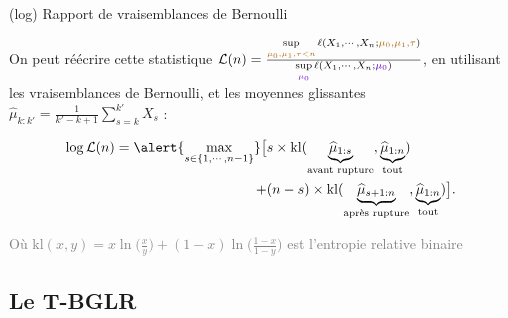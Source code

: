 \documentclass[11pt,french,ignorenonframetext,]{beamer}
\begin{document}
\begin{frame}{(log) Rapport de vraisemblances de Bernoulli}

  On peut réécrire cette statistique
  $\mathcal{L}(n) = \frac{\sup\limits_{\textcolor{gold}{\mu_0,\mu_1,\tau < n}}\ell(X_1,\cdots,X_n ; \textcolor{gold}{\mu_0,\mu_1,\tau})}{\sup\limits_{\textcolor{deeppurple}{\mu_0}}\ell(X_1,\cdots,X_n ;\textcolor{deeppurple}{\mu_0})}$,
  en utilisant les vraisemblances de Bernoulli, et les moyennes glissantes $\widehat{\mu}_{k:k'} = \frac{1}{k'-k+1} \sum\limits_{s=k}^{k'} X_s$ :

  \begin{align*}
    \log \mathcal{L}(n) = \alert{\max_{s \in \{1,\cdots,n-1\}}} \bigl[
      & s \times \mathrm{kl} (\underbrace{\widehat{\mu}_{1:s}}_{\text{avant rupture}},\underbrace{\widehat{\mu}_{1:n}}_{\text{tout}} ) \\
      + & (n-s) \times \mathrm{kl} (\underbrace{\widehat{\mu}_{s+1:n}}_{\text{après rupture}},\underbrace{\widehat{\mu}_{1:n}}_{\text{tout}} ) \bigr].
  \end{align*}

  \begin{small}
    \textcolor{gray}{Où $\mathrm{kl}(x,y) =x \ln\bigl(\frac{x}{y}\bigr) + (1-x)\ln\bigl(\frac{1-x}{1-y}\bigr)$ est l'entropie relative binaire}
  \end{small}

\end{frame}


\subsection{\hfill{}Le T-BGLR\hfill{}}
\end{document}
